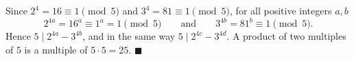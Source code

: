 Since $2^4=16\equiv1\pmod5$ and $3^4=81\equiv1\pmod5$, for all positive integers $a,b$
\[2^{4a}=16^a\equiv1^a=1\pmod5\qquad\text{and}\qquad3^{4b}=81^b\equiv1\pmod5 .\]
Hence $5\mid2^{4a}-3^{4b}$, and in the same way $5\mid2^{4c}-3^{4d}$. A product of two multiples of $5$ is a multiple of $5\cdot5=25$. $\blacksquare$
